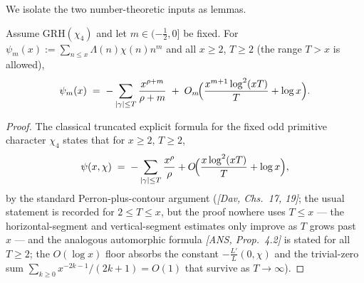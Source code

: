 We isolate the two number-theoretic inputs as lemmas.

\begin{lemma}\label{lem:trunc}
Assume GRH$(\chi_4)$ and let $m\in(-\tfrac12,0]$ be fixed. For
$\psi_m(x):=\sum_{n\le x}\Lambda(n)\chi(n)n^m$ and all $x\ge2$,
$T\ge2$ (the range $T>x$ is allowed),
\begin{equation}\label{eq:trunc}
\psi_m(x)\;=\;-\sum_{|\gamma|\le T}\frac{x^{\rho+m}}{\rho+m}
\;+\;O_m\!\Bigl(\frac{x^{m+1}\log^2(xT)}{T}+\log x\Bigr).
\end{equation}
\end{lemma}

\begin{proof}
The classical truncated explicit formula for the fixed odd primitive
character $\chi_4$ states that for $x\ge2$, $T\ge2$,
\begin{equation}\label{eq:classical}
\psi(x,\chi)\;=\;-\sum_{|\gamma|\le T}\frac{x^{\rho}}{\rho}
+O\!\Bigl(\frac{x\log^2(xT)}{T}+\log x\Bigr),
\end{equation}
by the standard Perron-plus-contour argument (\emph{[Dav, Chs.~17, 19]};
the usual statement is recorded for $2\le T\le x$, but the proof nowhere
uses $T\le x$ --- the horizontal-segment and vertical-segment estimates
only improve as $T$ grows past $x$ --- and the analogous automorphic
formula \emph{[ANS, Prop.~4.2]} is stated for all $T\ge2$; the $O(\log x)$
floor absorbs the constant $-\tfrac{L'}{L}(0,\chi)$ and the trivial-zero
sum $\sum_{k\ge0}x^{-2k-1}/(2k+1)=O(1)$ that survive as
$T\to\infty$).


\end{proof}
